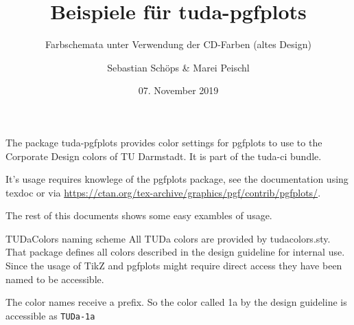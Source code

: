 \documentclass[
	german,%
	design=2008,%
	aspectratio=169,%
	accentcolor=2d,
	logo=false,%
	colorframetitle=true,%
]{tudabeamer}
\let\code\texttt
\begin{document}
\title{Beispiele für tuda-pgfplots}
\subtitle{Farbschemata unter Verwendung der CD-Farben (altes Design)}
\author{Sebastian Schöps \& Marei Peischl}




\date{07. November 2019}

\maketitle

\begin{frame}

	The package tuda-pgfplots provides color settings for pgfplots to use to the Corporate Design colors of TU Darmstadt. It is part of the tuda-ci bundle.

	It's usage requires knowlege of the pgfplots package, see the documentation using texdoc or via \url{https://ctan.org/tex-archive/graphics/pgf/contrib/pgfplots/}.

	The rest of this documents shows some easy exambles of usage.

\end{frame}

\begin{frame}{TUDaColors naming scheme}
	All TUDa colors are provided by tudacolors.sty. That package defines all colors described in the design guideline for internal use. Since the usage of TikZ and pgfplots might require direct access they have been named to be accessible.

	The color names receive a prefix. So the color called 1a by the design guideline is accessible as \code{TUDa-1a}
\end{frame}
\end{document}
